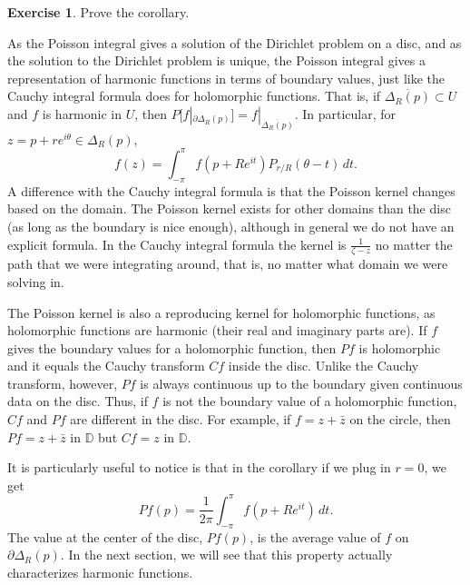 \documentclass[12pt,openany]{book}
\newcommand{\R}{{\mathbb{R}}}
\newcommand{\D}{{\mathbb{D}}}
\theoremstyle{plain}
\theoremstyle{remark}
\theoremstyle{definition}
\newenvironment{exbox}{%
    \def\FrameCommand{\vrule width 1pt \relax\hspace{10pt}}%
    \MakeFramed{\advance\hsize-\width\FrameRestore}%
}{%
    \endMakeFramed
}
\theoremstyle{exercise}
\newtheorem{exercise}{Exercise}[section]
\theoremstyle{example}
\begin{document}
\begin{exbox}
\begin{exercise}
Prove the corollary.
\end{exercise}
\end{exbox}

As the Poisson integral gives a solution of the Dirichlet problem on a disc,
and as the solution to the Dirichlet problem is unique,
the Poisson integral gives
a representation of harmonic functions in terms of boundary values, just
like the Cauchy integral formula does for holomorphic functions.
That is, if $\overline{\Delta_R(p)} \subset U$ and $f$ is harmonic in $U$,
then $P[f|_{\partial \Delta_R(p)}] = f|_{\overline{\Delta_R(p)}}$.
In particular, for $z = p+re^{i\theta} \in \Delta_R(p)$,
\begin{equation*}
f(z) = \int_{-\pi}^\pi f(p+Re^{it}) P_{r/R}(\theta-t) \, dt .
\end{equation*}
A difference with the Cauchy integral formula is that the Poisson kernel
changes based on the domain.  The Poisson kernel exists for other
domains than the disc (as long as the boundary is nice enough), although
in general we do not have an explicit formula.  In
the Cauchy integral formula the kernel is $\frac{1}{\zeta-z}$
no matter the path that we were integrating around, that is, no matter
what domain we were solving in.

The Poisson kernel is also a reproducing kernel for
holomorphic functions, as holomorphic functions are harmonic
(their real and imaginary parts are).  If $f$ gives the boundary
values for a holomorphic function, then $Pf$ is holomorphic and it equals
the Cauchy transform $Cf$ inside the disc.  Unlike the
Cauchy transform, however, $Pf$ is always continuous up to the boundary given
continuous data on the disc.  Thus, if $f$ is not the boundary value of
a holomorphic function, $Cf$ and $Pf$ are different in the disc.
For example, if $f=z+\bar{z}$ on the circle, then $Pf = z+\bar{z}$ in $\D$
but $Cf = z$ in $\D$.


It is particularly useful to notice is that
in the corollary if we plug in $r=0$, we get
\begin{equation} \label{eq:averageofPf}
Pf(p) = \frac{1}{2\pi} \int_{-\pi}^{\pi}f(p + R e^{it}) \, dt .
\end{equation}
The value at the center of the disc, $Pf(p)$, is the average 
value of $f$ on $\partial \Delta_R(p)$.
In the next section, we will see that this property actually characterizes
harmonic functions.
\end{document}
